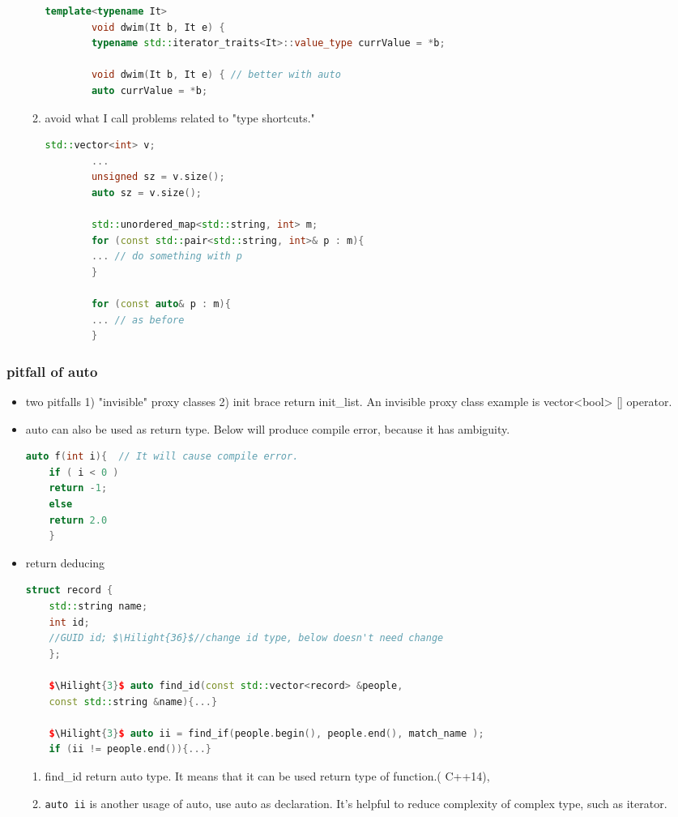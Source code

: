 \documentclass[a4paper,12pt,twoside]{book}
\newcommand{\Hilight}[1]{\makebox[0pt][l]{\color{yellow}\rule[-3pt]{#1em}{11pt}}}
\begin{document}
\begin{itemize}
\begin{enumerate}
\begin{lstlisting}[frame=single, language=c++]
		template<typename It>
		void dwim(It b, It e) {
		typename std::iterator_traits<It>::value_type currValue = *b;
		
		void dwim(It b, It e) { // better with auto
		auto currValue = *b;
		\end{lstlisting}
		
		\item avoid what I call problems related to "type shortcuts."
		\begin{lstlisting}[frame=single, language=c++]
		std::vector<int> v;
		...
		unsigned sz = v.size();
		auto sz = v.size();
		
		std::unordered_map<std::string, int> m;
		for (const std::pair<std::string, int>& p : m){
		... // do something with p
		}
		
		for (const auto& p : m){
		... // as before
		}
		\end{lstlisting}
	\end{enumerate}
\end{itemize}
	
\subsubsection{pitfall of auto}
\begin{itemize}
	\item two pitfalls 1) "invisible" proxy classes 2) init brace return init\_list. An invisible proxy class example is vector<bool> [] operator.
	
	\item auto can also be used as return type. Below will produce compile error, because it has ambiguity.
	\begin{lstlisting}[frame=single, language=c++]
	auto f(int i){  // It will cause compile error.
	if ( i < 0 )
	return -1;
	else
	return 2.0
	}
	\end{lstlisting}
	
	\item return deducing
	\begin{lstlisting}[frame=single, language=c++, mathescape=true]
	struct record {
	std::string name;
	int id;
	//GUID id; $\Hilight{36}$//change id type, below doesn't need change
	};
	
	$\Hilight{3}$ auto find_id(const std::vector<record> &people,
	const std::string &name){...}
	
	$\Hilight{3}$ auto ii = find_if(people.begin(), people.end(), match_name );
	if (ii != people.end()){...}
	\end{lstlisting}
	
	\begin{enumerate}
		\item find\_id return auto type. It means that it can be used return type of function.( C++14),
		\item \verb=auto ii= is another usage of auto,  use auto as declaration. It's helpful to reduce complexity of complex type, such as iterator.
	\end{enumerate}
	

	
\end{itemize}
\end{document}
